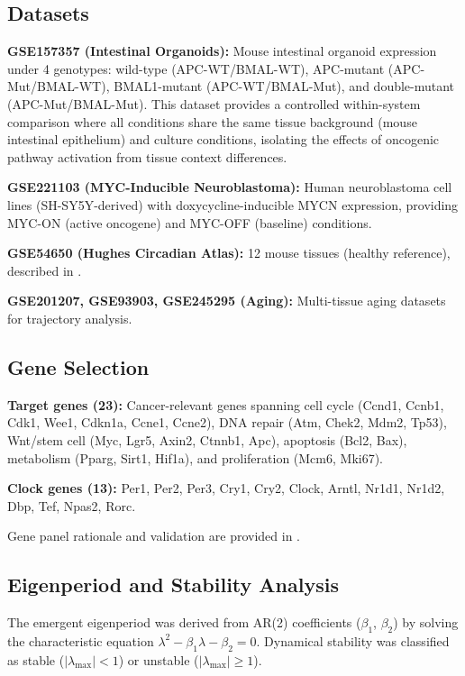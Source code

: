 \documentclass[11pt,letterpaper]{article}
\begin{document}
\subsection{Datasets}

\textbf{GSE157357 (Intestinal Organoids):} Mouse intestinal organoid expression under 4 genotypes: wild-type (APC-WT/BMAL-WT), APC-mutant (APC-Mut/BMAL-WT), BMAL1-mutant (APC-WT/BMAL-Mut), and double-mutant (APC-Mut/BMAL-Mut). This dataset provides a controlled within-system comparison where all conditions share the same tissue background (mouse intestinal epithelium) and culture conditions, isolating the effects of oncogenic pathway activation from tissue context differences.

\textbf{GSE221103 (MYC-Inducible Neuroblastoma):} Human neuroblastoma cell lines (SH-SY5Y-derived) with doxycycline-inducible MYCN expression, providing MYC-ON (active oncogene) and MYC-OFF (baseline) conditions.

\textbf{GSE54650 (Hughes Circadian Atlas):} 12 mouse tissues (healthy reference), described in \citet{whiteside2026paper1}.

\textbf{GSE201207, GSE93903, GSE245295 (Aging):} Multi-tissue aging datasets for trajectory analysis.

\subsection{Gene Selection}

\textbf{Target genes (23):} Cancer-relevant genes spanning cell cycle (Ccnd1, Ccnb1, Cdk1, Wee1, Cdkn1a, Ccne1, Ccne2), DNA repair (Atm, Chek2, Mdm2, Tp53), Wnt/stem cell (Myc, Lgr5, Axin2, Ctnnb1, Apc), apoptosis (Bcl2, Bax), metabolism (Pparg, Sirt1, Hif1a), and proliferation (Mcm6, Mki67).

\textbf{Clock genes (13):} Per1, Per2, Per3, Cry1, Cry2, Clock, Arntl, Nr1d1, Nr1d2, Dbp, Tef, Npas2, Rorc.

Gene panel rationale and validation are provided in \citet{whiteside2026paper1}.

\subsection{Eigenperiod and Stability Analysis}

The emergent eigenperiod was derived from AR(2) coefficients ($\beta_1$, $\beta_2$) by solving the characteristic equation $\lambda^2 - \beta_1\lambda - \beta_2 = 0$. Dynamical stability was classified as stable ($|\lambda_{\max}| < 1$) or unstable ($|\lambda_{\max}| \geq 1$).
\end{document}

